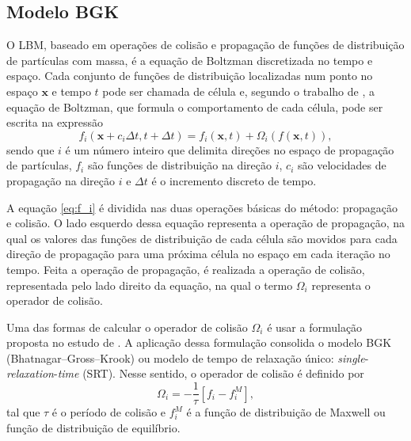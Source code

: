 \subsection{Modelo BGK}

O LBM, baseado em operações de colisão e propagação de funções de distribuição de partículas com massa, é a equação de Boltzman discretizada no tempo e espaço. Cada conjunto de funções de distribuição localizadas num ponto no espaço $\textbf{x}$ e tempo $t$ pode ser chamada de célula e, segundo o trabalho de , a equação de Boltzman, que formula o comportamento de cada célula, pode ser escrita na expressão 
\begin{equation}
	f_{i}(\textbf{x} + c_{i}\Delta t, t + \Delta t) = f_{i}(\textbf{x}, t) + \Omega_{i}(f(\textbf{x}, t)),
    \label{eq:f_i}
\end{equation}
sendo que $i$ é um número inteiro que delimita direções no espaço de propagação de partículas, $f_{i}$ são funções de distribuição na direção $i$, $c_{i}$ são velocidades de propagação na direção $i$ e $\Delta t$ é o incremento discreto de tempo. 

A equação \ref{eq:f_i} é dividida nas duas operações básicas do método: propagação e colisão. O lado esquerdo dessa equação representa a operação de propagação, na qual os valores das funções de distribuição de cada célula são movidos para cada direção de propagação para uma próxima célula no espaço em cada iteração no tempo. Feita a operação de propagação, é realizada a operação de colisão, representada pelo lado direito da equação, na qual o termo $\Omega_{i}$ representa o operador de colisão.

Uma das formas de calcular o operador de colisão $\Omega_{i}$ é usar a formulação proposta no estudo de . A aplicação dessa formulação consolida o modelo BGK (Bhatnagar–Gross–Krook) ou modelo de tempo de relaxação único: \textit{single}-\textit{relaxation}-\textit{time} (SRT). Nesse sentido, o operador de colisão é definido por
\begin{equation}
	\Omega_{i} = -\frac{1}{\tau}[f_{i} - f_{i}^{M}],
    \label{eq:omega_i}
\end{equation}
tal que $\tau$ é o período de colisão e $f_{i}^{M}$ é a função de distribuição de Maxwell ou função de distribuição de equilíbrio.

